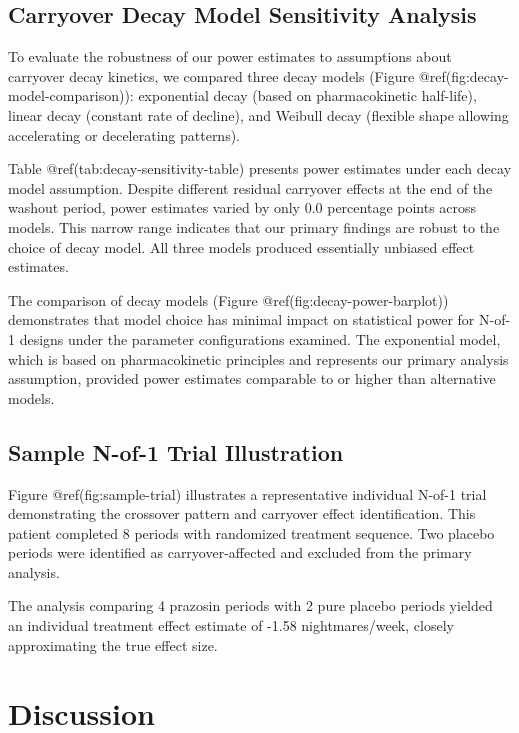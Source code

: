 \documentclass[
  11pt,
]{article}
\begin{document}
\subsection{Carryover Decay Model Sensitivity
Analysis}\label{carryover-decay-model-sensitivity-analysis}

To evaluate the robustness of our power estimates to assumptions about
carryover decay kinetics, we compared three decay models (Figure
@ref(fig:decay-model-comparison)): exponential decay (based on
pharmacokinetic half-life), linear decay (constant rate of decline), and
Weibull decay (flexible shape allowing accelerating or decelerating
patterns).

Table @ref(tab:decay-sensitivity-table) presents power estimates under
each decay model assumption. Despite different residual carryover
effects at the end of the washout period, power estimates varied by only
0.0 percentage points across models. This narrow range indicates that
our primary findings are robust to the choice of decay model. All three
models produced essentially unbiased effect estimates.

The comparison of decay models (Figure @ref(fig:decay-power-barplot))
demonstrates that model choice has minimal impact on statistical power
for N-of-1 designs under the parameter configurations examined. The
exponential model, which is based on pharmacokinetic principles and
represents our primary analysis assumption, provided power estimates
comparable to or higher than alternative models.

\subsection{Sample N-of-1 Trial
Illustration}\label{sample-n-of-1-trial-illustration}

Figure @ref(fig:sample-trial) illustrates a representative individual
N-of-1 trial demonstrating the crossover pattern and carryover effect
identification. This patient completed 8 periods with randomized
treatment sequence. Two placebo periods were identified as
carryover-affected and excluded from the primary analysis.

The analysis comparing 4 prazosin periods with 2 pure placebo periods
yielded an individual treatment effect estimate of -1.58
nightmares/week, closely approximating the true effect size.

\section{Discussion}\label{discussion}
\end{document}
